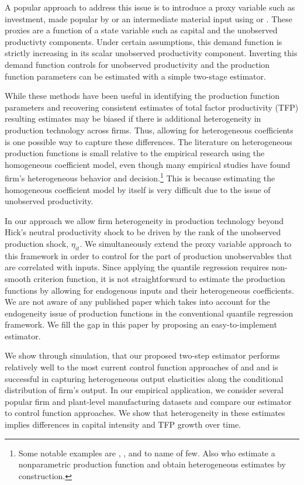\documentclass[11pt]{article}
\begin{document}
A popular approach to address this issue is to introduce a proxy variable such as investment, made popular by \cite{Olley1996} or an intermediate material input using \cite{Levinsohn2003} or \cite{Ackerberg2015}. These proxies are a function of a state variable such as capital and the unobserved productivty components. Under certain assumptions, this demand function is strictly increasing in its scalar unobserved productivity component. Inverting this demand function controls for unobserved productivity and the production function parameters can be estimated with a simple two-stage estimator.

While these methods have been useful in identifying the production function parameters and recovering consistent estimates of total factor productivity (TFP) resulting estimates may be biased if there is additional heterogeneity in production technology across firms. Thus, allowing for heterogeneous coefficients is one possible way to capture these differences. The literature on heterogeneous production functions is small relative to the empirical research using the homogeneous coefficient model, even though many empirical studies have found firm's heterogeneous behavior and decision.\footnote{Some notable examples are \cite*{Kasahara2015}, \cite*{balat}, \cite*{Li2017} and \cite*{mert} to name of few. Also \cite{Gandhi2020} who estimate a nonparametric production function and obtain heterogeneous estimates by construction.} This is because estimating the homogeneous coefficient model by itself is very difficult due to the issue of unobserved productivity. 

In our approach we allow firm heterogeneity in production technology beyond Hick's neutral productivity shock to be driven by the rank of the unobserved production shock, $\eta_{it}$.  We simultaneously extend the proxy variable approach to this framework in order to control for the part of production unobservables that are correlated with inputs. Since applying the quantile regression requires non-smooth criterion function, it is not straightforward to estimate the production functions by allowing for endogenous inputs and their heterogeneous coefficients. We are not aware of any published paper which takes into account for the endogeneity issue of production functions in the conventional quantile regression framework. We fill the gap in this paper by proposing an easy-to-implement estimator.

We show through simulation, that our proposed two-step estimator performs relatively well to the most current control function approaches of \cite{Levinsohn2003} and \cite{Ackerberg2015} and is successful in capturing heterogeneous output elasticities along the conditional distribution of firm's output. In our empirical application, we consider several popular firm and plant-level manufacturing datasets and compare our estimator to control function approaches. We show that heterogeneity in these estimates implies differences in capital intensity and TFP growth over time. 
\end{document}
